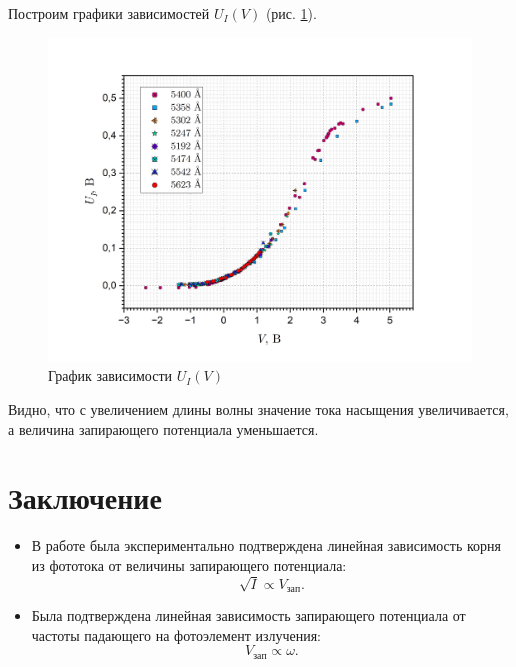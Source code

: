 \documentclass[a4paper, 12pt]{article}
\begin{document}
    Построим графики зависимостей ${U_I} (V)$ (рис. \ref{fig:iv_full_graph}).

    \begin{figure}[H]
        \centering
        \includegraphics[width = 0.5\linewidth]{images/iv_full_graph.png}
        \caption{График зависимости ${U_I} (V)$}
        \label{fig:iv_full_graph}
    \end{figure}

    Видно, что с увеличением длины волны значение тока насыщения увеличивается, а величина запирающего потенциала уменьшается.


    

    
    \section{Заключение}
    
    \begin{itemize}
        \item В работе была экспериментально подтверждена линейная зависимость корня из фототока от величины запирающего потенциала:
    	$$
    	\sqrt{I} \propto V_{зап}.
    	$$

        \item Была подтверждена линейная зависимость запирающего потенциала от частоты падающего на фотоэлемент излучения:
    	$$
    	V_{зап} \propto \omega.
    	$$
    \end{itemize}
    
\end{document}
